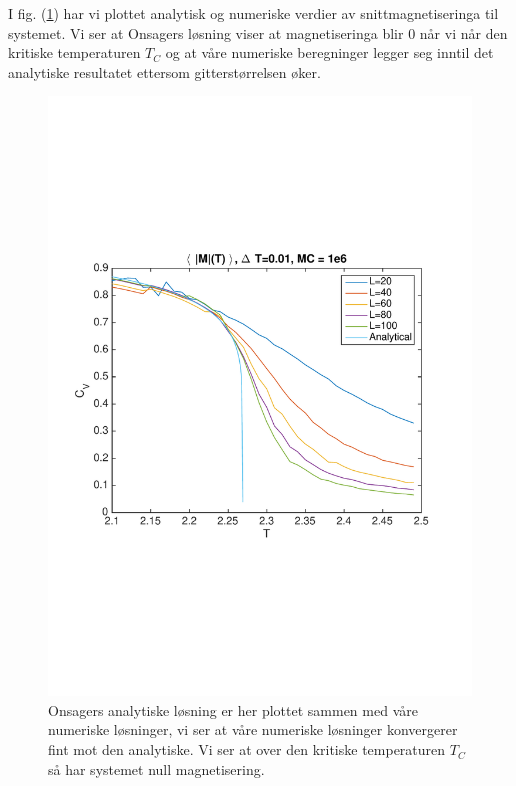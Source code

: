 \documentclass[norsk, 10pt]{article}
\begin{document}
I fig. (\ref{fig:avgmagnumanal}) har vi plottet analytisk og numeriske verdier av snittmagnetiseringa til systemet. Vi ser at Onsagers løsning viser at magnetiseringa blir 0 når vi når den kritiske temperaturen $T_C$ og at våre numeriske beregninger legger seg inntil det analytiske resultatet ettersom gitterstørrelsen øker.

\begin{figure}[H]
	\centering
	\includegraphics[scale = 0.5, trim = 1cm 8cm 1cm 8cm]{avg_mag_num_anal.pdf}
	\caption{Onsagers analytiske løsning er her plottet sammen med våre numeriske løsninger, vi ser at våre numeriske løsninger konvergerer fint mot den analytiske. Vi ser at over den kritiske temperaturen $T_C$ så har systemet null magnetisering.}
	\label{fig:avgmagnumanal}
\end{figure}
\end{document}
